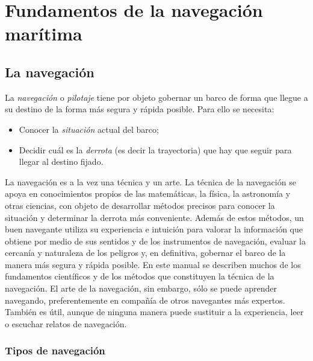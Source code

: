 \chapter{Fundamentos de la navegación marítima}
\label{ch:introduccion}
\section{La navegación}


La \emph{navegación} o \emph{pilotaje} tiene por objeto gobernar un barco de forma que llegue a su destino de la forma más segura y rápida posible. Para ello se necesita: 
\begin{itemize}
\item Conocer la \emph{situación} actual del barco;
\item Decidir cuál es la \emph{derrota} (es decir la trayectoria) que hay que seguir para llegar al destino fijado.
\end{itemize}

La navegación es a la vez una técnica y un arte. La técnica de la navegación se apoya en conocimientos  propios de las matemáticas, la física, la astronomía y otras ciencias, con objeto de desarrollar métodos precisos para conocer la situación y determinar la derrota más conveniente. Además de estos métodos, un buen navegante utiliza su experiencia e intuición para valorar la información que obtiene por medio de sus sentidos y de los instrumentos de navegación, evaluar la cercanía y naturaleza de los peligros y, en definitiva, gobernar el barco de la manera más segura y rápida posible. En este manual se describen muchos de los fundamentos científicos y de los métodos que constituyen la técnica de la navegación. El arte de la navegación, sin embargo, sólo se puede aprender navegando, preferentemente en compañía de otros navegantes más expertos. También es útil, aunque de ninguna manera puede sustituir a la experiencia, leer o escuchar relatos de navegación. 

\subsection{Tipos de navegación}

